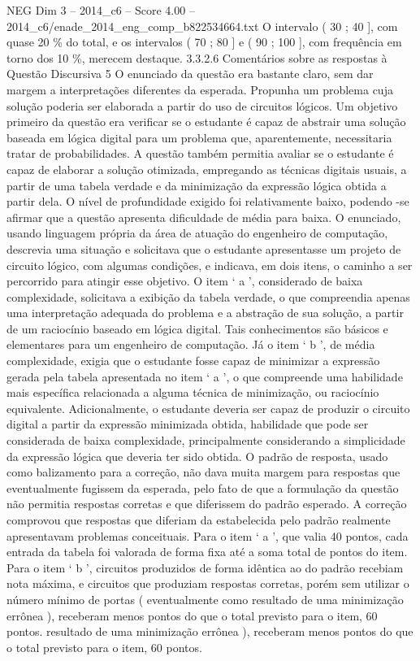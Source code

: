 \begin{textsample}{NEG Dim 3 – 2014\_c6 – Score 4.00 – 2014\_c6/enade\_2014\_eng\_comp\_b822534664.txt}
O intervalo ( 30 ; 40 ], com quase 20 \% do total, e os intervalos ( 70 ; 80 ] e ( 90 ; 100 ], com frequência em torno dos 10 \%, merecem destaque. 3.3.2.6 Comentários sobre as respostas à Questão Discursiva 5 O enunciado da questão era bastante claro, sem dar margem a interpretações diferentes da esperada.
Propunha um problema cuja solução poderia ser elaborada a partir do uso de circuitos lógicos.
Um objetivo primeiro da questão era verificar se o estudante é capaz de abstrair uma solução baseada em lógica digital para um problema que, aparentemente, necessitaria tratar de probabilidades.
A questão também permitia avaliar se o estudante é capaz de elaborar a solução otimizada, empregando as técnicas digitais usuais, a partir de uma tabela verdade e da minimização da expressão lógica obtida a partir dela.
O nível de profundidade exigido foi relativamente baixo, podendo -se afirmar que a questão apresenta dificuldade de média para baixa.
O enunciado, usando linguagem própria da área de atuação do engenheiro de computação, descrevia uma situação e solicitava que o estudante apresentasse um projeto de circuito lógico, com algumas condições, e indicava, em dois itens, o caminho a ser percorrido para atingir esse objetivo.
O item ‘ a ’, considerado de baixa complexidade, solicitava a exibição da tabela verdade, o que compreendia apenas uma interpretação adequada do problema e a abstração de sua solução, a partir de um raciocínio baseado em lógica digital.
Tais conhecimentos são básicos e elementares para um engenheiro de computação.
Já o item ‘ b ’, de média complexidade, exigia que o estudante fosse capaz de minimizar a expressão gerada pela tabela apresentada no item ‘ a ’, o que compreende uma habilidade mais específica relacionada a alguma técnica de minimização, ou raciocínio equivalente.
Adicionalmente, o estudante deveria ser capaz de produzir o circuito digital a partir da expressão minimizada obtida, habilidade que pode ser considerada de baixa complexidade, principalmente considerando a simplicidade da expressão lógica que deveria ter sido obtida.
O padrão de resposta, usado como balizamento para a correção, não dava muita margem para respostas que eventualmente fugissem da esperada, pelo fato de que a formulação da questão não permitia respostas corretas e que diferissem do padrão esperado.
A correção comprovou que respostas que diferiam da estabelecida pelo padrão realmente apresentavam problemas conceituais.
Para o item ‘ a ’, que valia 40 pontos, cada entrada da tabela foi valorada de forma fixa até a soma total de pontos do item.
Para o item ‘ b ’, circuitos produzidos de forma idêntica ao do padrão recebiam nota máxima, e circuitos que produziam respostas corretas, porém sem utilizar o número mínimo de portas ( eventualmente como resultado de uma minimização errônea ), receberam menos pontos do que o total previsto para o item, 60 pontos. resultado de uma minimização errônea ), receberam menos pontos do que o total previsto para o item, 60 pontos.

\end{textsample}

